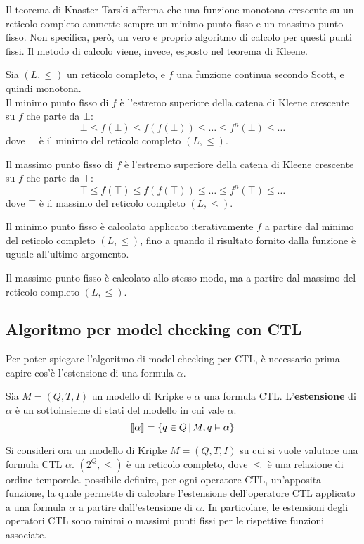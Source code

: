 Il teorema di Knaster-Tarski afferma che una funzione monotona
crescente su un reticolo completo ammette sempre un minimo punto fisso
e un massimo punto fisso. Non specifica, però, un vero e proprio
algoritmo di calcolo per questi punti fissi.
Il metodo di calcolo viene, invece, esposto nel teorema di Kleene.

\begin{thm}
    Sia $(L, \le)$ un reticolo completo, e $f$ una funzione continua
    secondo Scott, e quindi monotona.\\
    Il minimo punto fisso di $f$ è l'estremo superiore della
    catena di Kleene crescente su $f$ che parte da $\bot$:
    \[
        \bot \le f(\bot) \le f(f(\bot)) \le \ldots \le f^n(\bot) \le \ldots
    \]
    dove $\bot$ è il minimo del reticolo completo $(L, \le)$.

    Il massimo punto fisso di $f$ è l'estremo superiore della catena
    di Kleene crescente su $f$ che parte da $\top$:
    \[
        \top \le f(\top) \le f(f(\top)) \le \ldots \le f^n(\top) \le \ldots
    \]
    dove $\top$ è il massimo del reticolo completo $(L, \le)$.

    \begin{rem}
        Il minimo punto fisso è calcolato applicato iterativamente $f$
        a partire dal minimo del reticolo completo $(L, \le)$, fino
        a quando il risultato fornito dalla funzione è uguale all'ultimo
        argomento.

        Il massimo punto fisso è calcolato allo stesso modo, ma a partire
        dal massimo del reticolo completo $(L, \le)$.
    \end{rem}
\end{thm}

\subsection*{Algoritmo per model checking con CTL}
Per poter spiegare l'algoritmo di model checking per CTL, è necessario prima
capire cos'è l'estensione di una formula $\alpha$.
\begin{defn}
    Sia $M = (Q, T, I)$ un modello di Kripke e $\alpha$ una formula CTL.
    L'\textbf{estensione} di $\alpha$ è un sottoinsieme di stati del modello
    in cui vale $\alpha$.
    \[
        \llbracket \alpha \rrbracket = \left\{q \in Q \,|\, M, q \vDash \alpha\right\}
    \]
\end{defn}

Si consideri ora un modello di Kripke $M = (Q, T, I)$ su cui si vuole
valutare una formula CTL $\alpha$.
$(2^Q, \le)$ è un reticolo completo, dove $\le$ è una relazione di ordine
temporale.
\upperAccE possibile definire, per ogni operatore CTL, un'apposita funzione,
la quale permette di calcolare l'estensione dell'operatore CTL applicato
a una formula $\alpha$ a partire dall'estensione di $\alpha$. In particolare,
le estensioni degli operatori CTL sono minimi o massimi punti fissi
per le rispettive funzioni associate.

